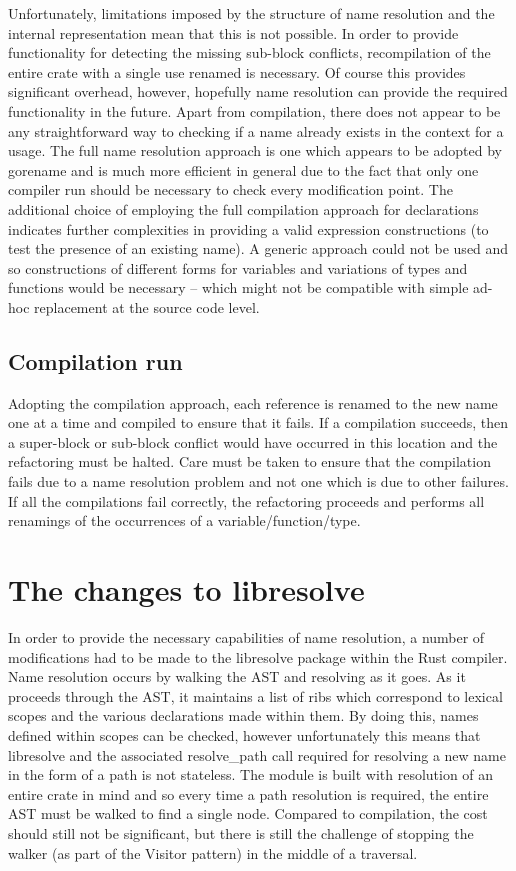Unfortunately, limitations imposed by the structure of name resolution and the internal representation mean that this is not possible. In order to provide functionality for detecting the missing sub-block conflicts, recompilation of the entire crate with a single use renamed is necessary. Of course this provides significant overhead, however, hopefully name resolution can provide the required functionality in the future. Apart from compilation, there does not appear to be any straightforward way to checking if a name already exists in the context for a usage. The full name resolution approach is one which appears to be adopted by gorename \cite{gorename15} and is much more efficient in general due to the fact that only one compiler run should be necessary to check every modification point. The additional choice of employing the full compilation approach for declarations indicates further complexities in providing a valid expression constructions (to test the presence of an existing name). A generic approach could not be used and so constructions of different forms for variables and variations of types and functions would be necessary -- which might not be compatible with simple ad-hoc replacement at the source code level.

\subsection{Compilation run}
Adopting the compilation approach, each reference is renamed to the new name one at a time and compiled to ensure that it fails. If a compilation succeeds, then a super-block or sub-block conflict would have occurred in this location and the refactoring must be halted. Care must be taken to ensure that the compilation fails due to a name resolution problem and not one which is due to other failures. If all the compilations fail correctly, the refactoring proceeds and performs all renamings of the occurrences of a variable/function/type.

\section{The changes to libresolve}\label{S:changes}
In order to provide the necessary capabilities of name resolution, a number of modifications had to be made to the libresolve package within the Rust compiler. Name resolution occurs by walking the AST and resolving as it goes. As it proceeds through the AST, it maintains a list of ribs which correspond to lexical scopes and the various declarations made within them. By doing this, names defined within scopes can be checked, however unfortunately this means that libresolve and the associated resolve\_path call required for resolving a new name in the form of a path is not stateless. The module is built with resolution of an entire crate in mind and so every time a path resolution is required, the entire AST must be walked to find a single node. Compared to compilation, the cost should still not be significant, but there is still the challenge of stopping the walker (as part of the Visitor pattern) in the middle of a traversal. 

